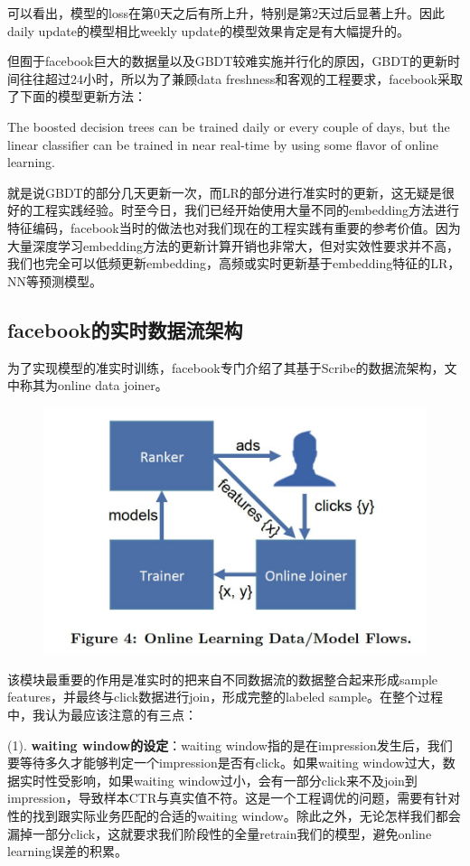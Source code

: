 \documentclass[12pt]{article}
\begin{document}
可以看出，模型的loss在第0天之后有所上升，特别是第2天过后显著上升。因此daily update的模型相比weekly update的模型效果肯定是有大幅提升的。

但囿于facebook巨大的数据量以及GBDT较难实施并行化的原因，GBDT的更新时间往往超过24小时，所以为了兼顾data freshness和客观的工程要求，facebook采取了下面的模型更新方法：

The boosted decision trees can be trained daily or every couple of days, but the linear classifier can be trained in near real-time by using some flavor of online learning.

就是说GBDT的部分几天更新一次，而LR的部分进行准实时的更新，这无疑是很好的工程实践经验。时至今日，我们已经开始使用大量不同的embedding方法进行特征编码，facebook当时的做法也对我们现在的工程实践有重要的参考价值。因为大量深度学习embedding方法的更新计算开销也非常大，但对实效性要求并不高，我们也完全可以低频更新embedding，高频或实时更新基于embedding特征的LR，NN等预测模型。

\subsection{facebook的实时数据流架构}

为了实现模型的准实时训练，facebook专门介绍了其基于Scribe的数据流架构，文中称其为online data joiner。
\begin{figure}[H]
    \centering
    \includegraphics[width=.6\textwidth]{fig/Facebook_Online_Data_Joiner.jpg}
\end{figure}

该模块最重要的作用是准实时的把来自不同数据流的数据整合起来形成sample features，并最终与click数据进行join，形成完整的labeled sample。在整个过程中，我认为最应该注意的有三点：

(1). \textbf{waiting window的设定}：waiting window指的是在impression发生后，我们要等待多久才能够判定一个impression是否有click。如果waiting window过大，数据实时性受影响，如果waiting window过小，会有一部分click来不及join到impression，导致样本CTR与真实值不符。这是一个工程调优的问题，需要有针对性的找到跟实际业务匹配的合适的waiting window。除此之外，无论怎样我们都会漏掉一部分click，这就要求我们阶段性的全量retrain我们的模型，避免online learning误差的积累。
\end{document}
